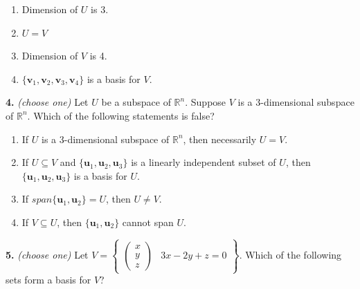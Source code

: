 \documentclass[10pt,a4paper]{article}
\begin{document}
\begin{enumerate}[label=(\Alph*)]
\item Dimension of \(U\) is 3.
\item \(U=V\)
\item Dimension of \(V\) is 4.
\item \(\{\mathbf{v}_1,\mathbf{v}_2,\mathbf{v}_3,\mathbf{v}_4\}\) is a basis for \(V\).
\end{enumerate}
\smallskip
\textbf{4.} \textit{(choose one)} Let \(U\) be a subspace of \(\mathbb{R}^n\). Suppose \(V\) is a 3-dimensional subspace of  \(\mathbb{R}^n\). Which of the following statements is false?

\begin{enumerate}[label=(\Alph*)]
\item If \(U\) is a 3-dimensional subspace of \(\mathbb R^n\), then necessarily \(U=V\).
\item If \(U\subseteq V\) and \(\{\mathbf{u}_1,\mathbf{u}_2,\mathbf{u}_3\}\) is a linearly independent subset of \(U\), then \(\{\mathbf{u}_1,\mathbf{u}_2,\mathbf{u}_3\}\) is a basis for \(U\).
\item If \(span\{\mathbf{u}_1,\mathbf{u}_2\}=U\), then \(U\neq V\).
\item If \(V\subseteq U\), then \(\{\mathbf{u}_1,\mathbf{u}_2\}\) cannot span \(U\).
\end{enumerate}
\smallskip
\textbf{5.} \textit{(choose one)} Let \(V=\left\{\begin{array}{c|c}\begin{pmatrix}x\\y\\z\end{pmatrix}&3x-2y+z=0\end{array}\right\}\). Which of the following sets form a basis for \(V\)?
\end{document}
